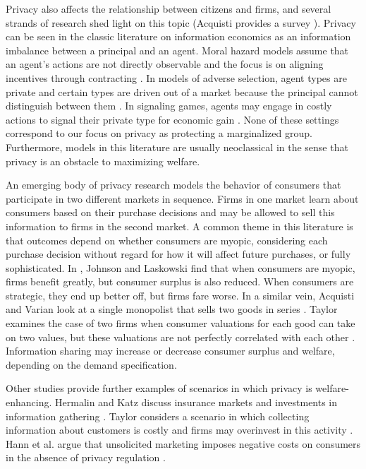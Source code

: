 Privacy also affects the relationship between citizens and firms, and several strands of research shed light on this topic (Acquisti provides a survey \cite{acquisti2010economics}).  Privacy can be seen in the classic literature on information economics as an information imbalance between a principal and an agent.  Moral hazard models assume that an agent's actions are not directly observable and the focus is on aligning incentives through contracting \cite{holmstrom1979moral}\cite{stiglitz1981credit}.  In models of adverse selection, agent types are private and certain types are driven out of a market because the principal cannot distinguish between them \cite{akerlof1995market}.  In signaling games, agents may engage in costly actions to signal their private type for economic gain \cite{spence1973job}.  None of these settings correspond to our focus on privacy as protecting a marginalized group.  Furthermore, models in this literature are usually neoclassical in the sense that privacy is an obstacle to maximizing welfare. 

An emerging body of privacy research models the behavior of consumers that participate in two different markets in sequence.  Firms in one market learn about consumers based on their purchase decisions and may be allowed to sell this information to firms in the second market.  A common theme in this literature is that outcomes depend on whether consumers are myopic, considering each purchase decision without regard for how it will affect future purchases, or fully sophisticated.  In \cite{johnsoncaviar}, Johnson and Laskowski find that when consumers are myopic, firms benefit greatly, but consumer surplus is also reduced. When consumers are strategic, they end up better off, but firms fare worse.  In a similar vein, Acquisti and Varian look at a single monopolist that sells two goods in series \cite{acquisti2005conditioning}.  Taylor examines the case of two firms when consumer valuations for each good can take on two values, but these valuations are not perfectly correlated with each other \cite{taylor2004consumer}.  Information sharing may increase or decrease consumer surplus and welfare, depending on the demand specification.  

Other studies provide further examples of scenarios in which privacy is welfare-enhancing.  Hermalin and Katz discuss insurance markets and investments in information gathering \cite{hermalin2006privacy}.  Taylor considers a scenario in which collecting information about customers is costly and firms may overinvest in this activity \cite{taylor2003privacy}.  Hann et al. argue that unsolicited marketing imposes negative costs on consumers in the absence of privacy regulation \cite{hann2008consumer}.

